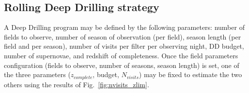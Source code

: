 \documentclass[\docopts]{\docclass}
\newcommand{\zcomp}{\mbox{$z_{complete}$}}
\newcommand{\nvisits}{$N_{visits}$}
\begin{document}
\subsection{Rolling Deep Drilling strategy}
A Deep Drilling program may be defined by the following parameters: number of fields to observe, number of season of observation (per field), season length (per field and per season),  number of visits per filter per observing night, DD budget, number of supernovae, and redshift of completeness.  Once the field parameters configuration (fields to observe, number of seasons, season length) is set, one of the three parameters (\zcomp, budget, \nvisits) may be fixed to estimate the two others using the results of Fig.~\ref{fig:nvisits_zlim}. 

\end{document}
